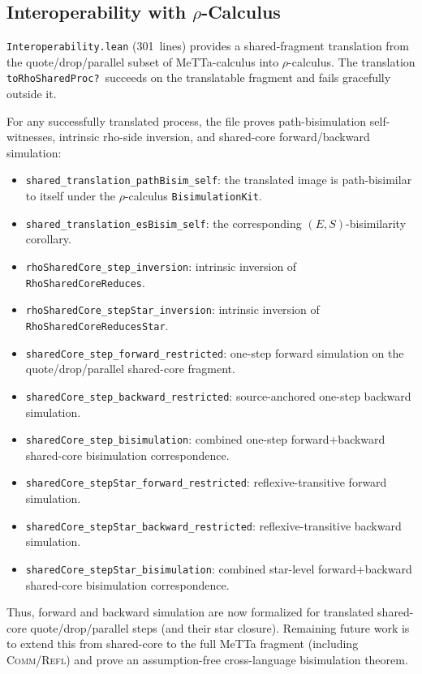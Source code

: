 \documentclass[11pt]{article}
\theoremstyle{definition}
\theoremstyle{remark}
\begin{document}
\subsection{Interoperability with \texorpdfstring{$\rho$}{rho}-Calculus}

\texttt{Interoperability.lean} (301~lines) provides a shared-fragment
translation from the quote/drop/parallel subset of MeTTa-calculus into
$\rho$-calculus.  The translation \texttt{toRhoSharedProc?}~succeeds on
the translatable fragment and fails gracefully outside it.

For any successfully translated process, the file proves path-bisimulation
self-witnesses, intrinsic rho-side inversion, and shared-core
forward/backward simulation:

\begin{itemize}
\item \texttt{shared\_translation\_pathBisim\_self}: the translated image
  is path-bisimilar to itself under the $\rho$-calculus
  \texttt{BisimulationKit}.
\item \texttt{shared\_translation\_esBisim\_self}: the corresponding
  $(E,S)$-bisimilarity corollary.
\item \texttt{rhoSharedCore\_step\_inversion}: intrinsic inversion of
  \texttt{RhoSharedCoreReduces}.
\item \texttt{rhoSharedCore\_stepStar\_inversion}: intrinsic inversion of
  \texttt{RhoSharedCoreReducesStar}.
\item \texttt{sharedCore\_step\_forward\_restricted}: one-step forward
  simulation on the quote/drop/parallel shared-core fragment.
\item \texttt{sharedCore\_step\_backward\_restricted}: source-anchored
  one-step backward simulation.
\item \texttt{sharedCore\_step\_bisimulation}: combined one-step
  forward+backward shared-core bisimulation correspondence.
\item \texttt{sharedCore\_stepStar\_forward\_restricted}: reflexive-transitive
  forward simulation.
\item \texttt{sharedCore\_stepStar\_backward\_restricted}: reflexive-transitive
  backward simulation.
\item \texttt{sharedCore\_stepStar\_bisimulation}: combined star-level
  forward+backward shared-core bisimulation correspondence.
\end{itemize}

\noindent
Thus, forward and backward simulation are now formalized for translated
shared-core quote/drop/parallel steps (and their star closure).  Remaining
future work is to extend this from shared-core to the full MeTTa fragment
(including \textsc{Comm}/\textsc{Refl}) and prove an assumption-free
cross-language bisimulation theorem.
\end{document}
